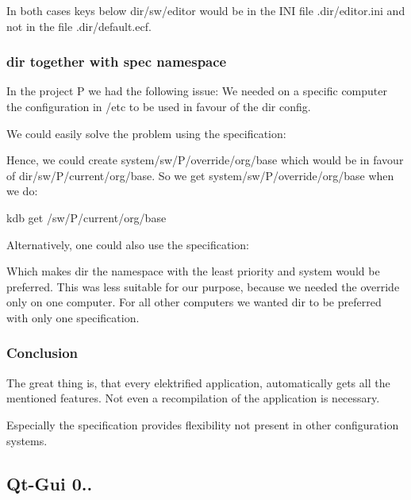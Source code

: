 In both cases keys below dir/sw/editor would be in the I\+NI file {\ttfamily .dir/editor.\+ini} and not in the file {\ttfamily .dir/default.\+ecf}.

\subsubsection*{dir together with spec namespace}

In the project P we had the following issue\+: We needed on a specific computer the configuration in /etc to be used in favour of the dir config.

We could easily solve the problem using the specification\+: 


Hence, we could create system/sw/\+P/override/org/base which would be in favour of dir/sw/\+P/current/org/base. So we get system/sw/\+P/override/org/base when we do\+: \begin{DoxyVerb}kdb get /sw/P/current/org/base
\end{DoxyVerb}


Alternatively, one could also use the specification\+: 


Which makes dir the namespace with the least priority and system would be preferred. This was less suitable for our purpose, because we needed the override only on one computer. For all other computers we wanted dir to be preferred with only one specification.

\subsubsection*{Conclusion}

The great thing is, that every elektrified application, automatically gets all the mentioned features. Not even a recompilation of the application is necessary.

Especially the specification provides flexibility not present in other configuration systems.

\subsection*{Qt-\/\+Gui 0..}

